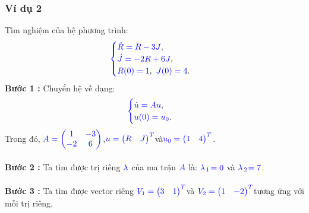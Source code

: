 \documentclass[a4paper]{article}
\begin{document}
\subsubsection{Ví dụ 2}
Tìm nghiệm của hệ phương trình:
\begin{align}
	    \textcolor{blue}{
	    \begin{cases}
            \dot R = R - 3J \textcolor{black}{,}\\
            \dot J = -2R + 6J \textcolor{black}{,}\\
            R(0) = 1\textcolor{black}{,} \enskip J(0) = 4 \textcolor{black}{.}
        \end{cases}
        }
        \notag
	\end{align}
{\bfseries Bước 1 :} Chuyển hệ về dạng:
\begin{align}
	    \textcolor{blue}{
	    \begin{cases}
            \dot u = Au \textcolor{black}{,}\\
            u(0) = u\sb{0}\textcolor{black}{.}
        \end{cases}
        }
        \notag
	\end{align}
Trong đó,  $\textcolor{blue}{A = \begin{pmatrix} 1 & -3\\ -2 & 6 \end{pmatrix}}$,\enskip $\textcolor{blue}{u = \begin{pmatrix} R & J \end{pmatrix}\sp{T}}$\enskip và\enskip $\textcolor{blue}{u\sb{0} = \begin{pmatrix} 1 & 4 \end{pmatrix}\sp{T}}$.\\\\
{\bfseries Bước 2 :} Ta tìm được trị riêng $\textcolor{blue}{\lambda}$ của ma trận $\textcolor{blue}{A}$ là: $\textcolor{blue}{\lambda}$$\textcolor{blue}{\sb{1}}$$\textcolor{blue}{=0}$ và $\textcolor{blue}{\lambda}$$\textcolor{blue}{\sb{2}}$$\textcolor{blue}{=7}$.\\\\
{\bfseries Bước 3 :} Ta tìm được vector riêng \enskip $\textcolor{blue}{V\sb{1} = \begin{pmatrix} 3 & 1 \end{pmatrix}\sp{T}}$\enskip và \enskip $\textcolor{blue}{V\sb{2} = \begin{pmatrix} 1 & -2 \end{pmatrix}\sp{T}}$\enskip tương ứng với mỗi trị riêng.\\\\
\end{document}
